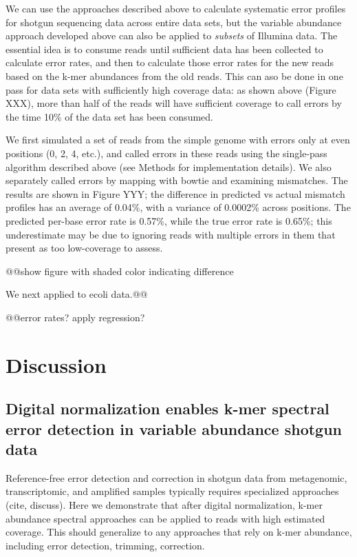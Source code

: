 \documentclass{article}
\begin{document}
We can use the approaches described above to calculate systematic
error profiles for shotgun sequencing data across entire data sets,
but the variable abundance approach developed above can also be
applied to {\em subsets} of Illumina data.  The essential idea is to
consume reads until sufficient data has been collected to calculate
error rates, and then to calculate those error rates for the new reads
based on the k-mer abundances from the old reads.  This can aso be
done in one pass for data sets with sufficiently high coverage data:
as shown above (Figure XXX), more than half of the reads will have
sufficient coverage to call errors by the time 10\% of the data set
has been consumed.

We first simulated a set of reads from the simple genome with errors
only at even positions (0, 2, 4, etc.), and called errors in these
reads using the single-pass algorithm described above (see Methods for
implementation details).  We also separately called errors by mapping
with bowtie and examining mismatches.  The results are shown in Figure
YYY; the difference in predicted vs actual mismatch profiles has an
average of 0.04\%, with a variance of 0.0002\% across positions.  The
predicted per-base error rate is 0.57\%, while the true error rate is
0.65\%; this underestimate may be due to ignoring reads with multiple
errors in them that present as too low-coverage to assess.

@@show figure with shaded color indicating difference

We next applied to ecoli data.@@

@@error rates? apply regression?

\section{Discussion}

\subsection{Digital normalization enables k-mer spectral error detection in variable abundance shotgun data}

Reference-free error detection and correction in shotgun data from
metagenomic, transcriptomic, and amplified samples typically requires
specialized approaches (cite, discuss).  Here we demonstrate that
after digital normalization, k-mer abundance spectral approaches can
be applied to reads with high estimated coverage.  This should
generalize to any approaches that rely on k-mer abundance, including
error detection, trimming, correction.
\end{document}
